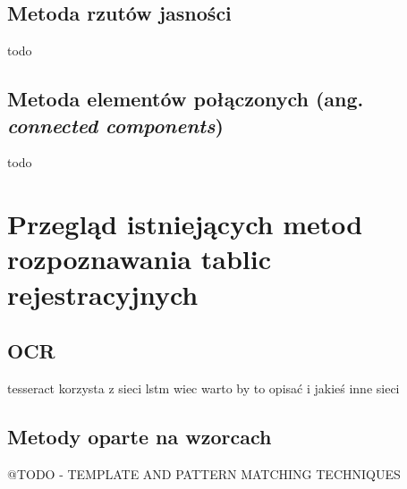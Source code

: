 \subsection{Metoda rzutów jasności}
todo

\subsection{Metoda elementów połączonych (ang. \textit{connected components})}
todo


\section{Przegląd istniejących metod rozpoznawania tablic rejestracyjnych}

\subsection{OCR}
tesseract korzysta z sieci lstm wiec warto by to opisać i jakieś inne sieci

\subsection{Metody oparte na wzorcach}
@TODO - TEMPLATE AND PATTERN MATCHING TECHNIQUES